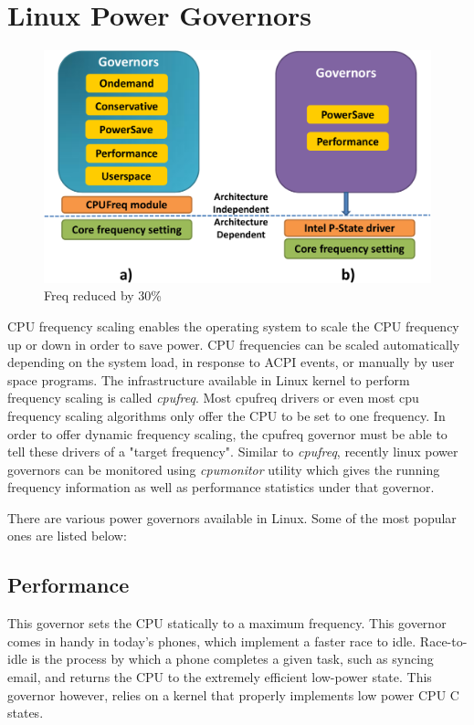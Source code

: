 \section{Linux Power Governors}\label{sec:linux-powergov}

\begin{figure}[h]
  \begin{center}
\includegraphics[width=\linewidth]{figs/gov-crop.pdf}
  \end{center}
  \vspace{-0.1in}
  \caption{Freq reduced by 30\%}
	\label{fig:gov}
\end{figure}



CPU frequency scaling enables the operating system to scale the CPU frequency up or down in order to save power. CPU frequencies can be scaled automatically depending on the system load, in response to ACPI events, or manually by user space programs. The infrastructure available in Linux kernel to perform frequency scaling is called \emph{cpufreq}. Most cpufreq drivers or even most cpu frequency scaling algorithms only offer the CPU to be set to one frequency. In order to offer dynamic frequency scaling, the cpufreq governor must be able to tell these drivers of a "target frequency". Similar to \emph{cpufreq}, recently linux power governors can be monitored using \emph{cpumonitor} utility which gives the running frequency information as well as performance statistics under that governor.

There are various power governors available in Linux. Some of the most popular ones are listed below:
\subsection{Performance}
This governor sets the CPU statically to a maximum frequency. This governor comes in handy in today’s phones, which implement a faster race to idle. Race-to-idle is the process by which a phone completes a given task, such as syncing email, and returns the CPU to the extremely efficient low-power state. This governor however, relies on a kernel that properly implements low power CPU C states.

